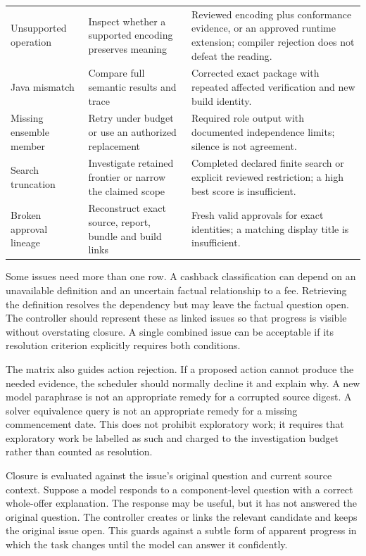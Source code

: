 \documentclass[12pt,a4paper,oneside,openany]{book}
\begin{document}
\begin{longtable}{@{}P{27mm}P{56mm}P{65mm}@{}}
Unsupported operation & Inspect whether a supported encoding preserves meaning & Reviewed encoding plus conformance evidence, or an approved runtime extension; compiler rejection does not defeat the reading.\\
Java mismatch & Compare full semantic results and trace & Corrected exact package with repeated affected verification and new build identity.\\
Missing ensemble member & Retry under budget or use an authorized replacement & Required role output with documented independence limits; silence is not agreement.\\
Search truncation & Investigate retained frontier or narrow the claimed scope & Completed declared finite search or explicit reviewed restriction; a high best score is insufficient.\\
Broken approval lineage & Reconstruct exact source, report, bundle and build links & Fresh valid approvals for exact identities; a matching display title is insufficient.\\
\bottomrule
\end{longtable}

Some issues need more than one row. A cashback classification can depend on an
unavailable definition and an uncertain factual relationship to a fee. Retrieving
the definition resolves the dependency but may leave the factual question open.
The controller should represent these as linked issues so that progress is visible
without overstating closure. A single combined issue can be acceptable if its
resolution criterion explicitly requires both conditions.

The matrix also guides action rejection. If a proposed action cannot produce the
needed evidence, the scheduler should normally decline it and explain why. A new
model paraphrase is not an appropriate remedy for a corrupted source digest. A
solver equivalence query is not an appropriate remedy for a missing commencement
date. This does not prohibit exploratory work; it requires that exploratory work
be labelled as such and charged to the investigation budget rather than counted
as resolution.

Closure is evaluated against the issue's original question and current source
context. Suppose a model responds to a component-level question with a correct
whole-offer explanation. The response may be useful, but it has not answered the
original question. The controller creates or links the relevant candidate and
keeps the original issue open. This guards against a subtle form of apparent
progress in which the task changes until the model can answer it confidently.
\end{document}
